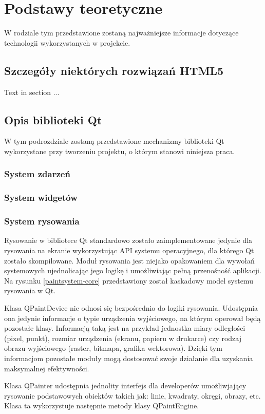 \documentclass[polish]{inz}
\begin{document}
\chapter{Podstawy teoretyczne}
W rodziale tym przedstawione zostaną najważniejsze informacje dotyczące technologii wykorzystanych w projekcie. 

\section{Szczegóły niektórych rozwiązań HTML5}
Text in section ...

\section{Opis biblioteki Qt}
W tym podrozdziale zostaną przedstawione mechanizmy biblioteki Qt wykorzystane przy tworzeniu projektu, o którym stanowi niniejsza praca. 

\subsection{System zdarzeń}


\subsection{System widgetów}


\subsection{System rysowania}
Rysowanie w bibliotece Qt standardowo zostało zaimplementowane jedynie dla rysowania na ekranie wykorzystując API systemu operacyjnego, dla którego Qt zostało skompilowane. Moduł rysowania jest niejako opakowaniem dla wywołań systemowych ujednolicając jego logikę i umożliwiając pełną przenośność aplikacji. Na rysunku \ref{paintsystem-core} przedstawiony został kaskadowy model systemu rysowania w Qt. 

Klasa QPaintDevice nie odnosi się bezpośrednio do logiki rysowania. Udostępnia ona jedynie informacje o typie urządzenia wyjściowego, na którym operował będą pozostałe klasy. Informacją taką jest na przykład jednostka miary odległości (pixel, punkt), rozmiar urządzenia (ekranu, papieru w drukarce) czy rodzaj obrazu wyjściowego (raster, bitmapa, grafika wektorowa). Dzięki tym informacjom pozostałe moduły mogą dostosować swoje działanie dla uzyskania maksymalnej efektywności.
 
Klasa QPainter udostępnia jednolity interfejs dla developerów umożliwjający rysowanie podstawowych obiektów takich jak: linie, kwadraty, okręgi, obrazy, etc. Klasa ta wykorzystuje następnie metody klasy QPaintEngine. 
\end{document}
